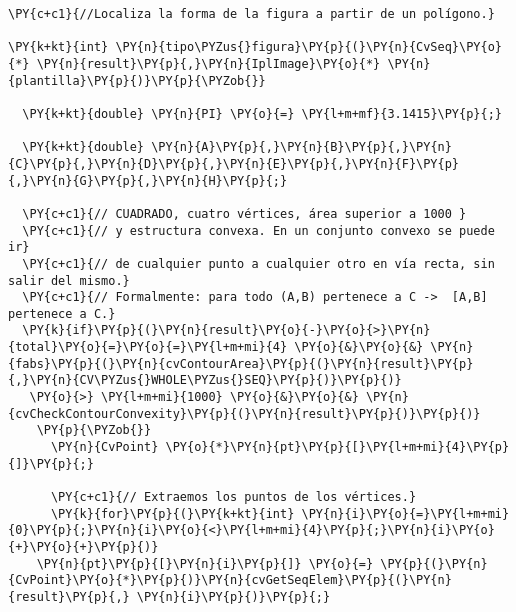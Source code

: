 \begin{Verbatim}[commandchars=\\\{\}]
\PY{c+c1}{//Localiza la forma de la figura a partir de un polígono.}

\PY{k+kt}{int} \PY{n}{tipo\PYZus{}figura}\PY{p}{(}\PY{n}{CvSeq}\PY{o}{*} \PY{n}{result}\PY{p}{,}\PY{n}{IplImage}\PY{o}{*} \PY{n}{plantilla}\PY{p}{)}\PY{p}{\PYZob{}}  

  \PY{k+kt}{double} \PY{n}{PI} \PY{o}{=} \PY{l+m+mf}{3.1415}\PY{p}{;}

  \PY{k+kt}{double} \PY{n}{A}\PY{p}{,}\PY{n}{B}\PY{p}{,}\PY{n}{C}\PY{p}{,}\PY{n}{D}\PY{p}{,}\PY{n}{E}\PY{p}{,}\PY{n}{F}\PY{p}{,}\PY{n}{G}\PY{p}{,}\PY{n}{H}\PY{p}{;}

  \PY{c+c1}{// CUADRADO, cuatro vértices, área superior a 1000 }
  \PY{c+c1}{// y estructura convexa. En un conjunto convexo se puede ir}
  \PY{c+c1}{// de cualquier punto a cualquier otro en vía recta, sin salir del mismo.}
  \PY{c+c1}{// Formalmente: para todo (A,B) pertenece a C ->  [A,B] pertenece a C.}
  \PY{k}{if}\PY{p}{(}\PY{n}{result}\PY{o}{-}\PY{o}{>}\PY{n}{total}\PY{o}{=}\PY{o}{=}\PY{l+m+mi}{4} \PY{o}{&}\PY{o}{&} \PY{n}{fabs}\PY{p}{(}\PY{n}{cvContourArea}\PY{p}{(}\PY{n}{result}\PY{p}{,}\PY{n}{CV\PYZus{}WHOLE\PYZus{}SEQ}\PY{p}{)}\PY{p}{)}
   \PY{o}{>} \PY{l+m+mi}{1000} \PY{o}{&}\PY{o}{&} \PY{n}{cvCheckContourConvexity}\PY{p}{(}\PY{n}{result}\PY{p}{)}\PY{p}{)}  
    \PY{p}{\PYZob{}}
      \PY{n}{CvPoint} \PY{o}{*}\PY{n}{pt}\PY{p}{[}\PY{l+m+mi}{4}\PY{p}{]}\PY{p}{;}

      \PY{c+c1}{// Extraemos los puntos de los vértices.}
      \PY{k}{for}\PY{p}{(}\PY{k+kt}{int} \PY{n}{i}\PY{o}{=}\PY{l+m+mi}{0}\PY{p}{;}\PY{n}{i}\PY{o}{<}\PY{l+m+mi}{4}\PY{p}{;}\PY{n}{i}\PY{o}{+}\PY{o}{+}\PY{p}{)}
	\PY{n}{pt}\PY{p}{[}\PY{n}{i}\PY{p}{]} \PY{o}{=} \PY{p}{(}\PY{n}{CvPoint}\PY{o}{*}\PY{p}{)}\PY{n}{cvGetSeqElem}\PY{p}{(}\PY{n}{result}\PY{p}{,} \PY{n}{i}\PY{p}{)}\PY{p}{;}


\end{Verbatim}
